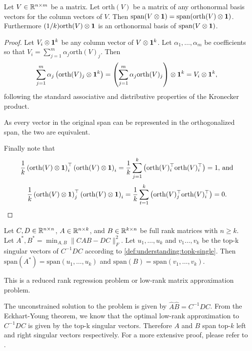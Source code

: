 \begin{lemma}\label{lem:understanding:orth_kronecker}
    Let $V \in \mathbb{R}^{n \times m}$ be a matrix. Let $\mathrm{orth}(V)$ be a matrix of any orthonormal basis vectors for the column vectors of $V$. Then $\mathrm{span}(V\otimes {\bm{1}}) = \mathrm{span}(\mathrm{orth}(V) \otimes {\bm{1}})$. Furthermore $(1/k) \mathrm{orth}(V) \otimes {\bm{1}}$ is an orthonormal basis of $\mathrm{span}(V \otimes {\bm{1}})$.
\end{lemma}

\begin{proof}
    Let $V_i \otimes {\bm{1}}^k$ be any column vector of $V\otimes {\bm{1}}^k$. Let $\alpha_1,\dots,\alpha_m$ be coefficients so that $V_i = \sum_{j=1}^m \alpha_j \mathrm{orth}(V)_j$. Then $$\sum_{j=1}^m \alpha_j \left(\mathrm{orth}(V)_j \otimes {\bm{1}}^k\right) = \left(\sum_{j=1}^m \alpha_j \mathrm{orth}(V)_j\right) \otimes {\bm{1}}^k = V_i \otimes {\bm{1}}^k,$$ following the standard associative and distributive properties of the Kronecker product.

    As every vector in the original span can be represented in the orthogonalized span, the two are equivalent.

    Finally note that $$\frac{1}{k}\left(\mathrm{orth}(V) \otimes {\bm{1}}\right)_i^\top \left(\mathrm{orth}(V) \otimes {\bm{1}}\right)_i = \frac{1}{k}\sum_{j=1}^k \left(\mathrm{orth}(V)_i^\top \mathrm{orth}(V)_i^\top\right) = 1,\,\text{and}$$ $$\frac{1}{k}\left(\mathrm{orth}(V) \otimes {\bm{1}}\right)_j^\top \left(\mathrm{orth}(V) \otimes {\bm{1}}\right)_i = \frac{1}{k}\sum_{t=1}^k \left(\mathrm{orth}(V)_j^\top \mathrm{orth}(V)_i^\top\right) = 0.$$
\end{proof}

\begin{lemma}\label{lem:understanding:rrr}
    Let $C,D \in \mathbb{R}^{n \times n}$, $A\in\mathbb{R}^{n \times k}$, and $B\in\mathbb{R}^{k \times n}$ be full rank matrices with $n \geq k$. Let $A^*, B^* = \min_{A,B} \lVert CAB - DC\rVert^2_F$. Let ${u_1,\dots,u_k}$ and ${v_1\dots,v_k}$ be the top-k singular vectors of $C^{-1}DC$ according to \autoref{def:understanding:topk-single}. Then $\mathrm{span}(A^*) = \mathrm{span}({u_1,\dots,u_k})$ and $\mathrm{span}(B) = \mathrm{span}({v_1,\dots,v_k})$.
\end{lemma}

This is a reduced rank regression problem \parencite{izenman1975reduced} or low-rank matrix approximation problem. 

The unconstrained solution to the problem is given by $\hat{A}\hat{B} = C^{-1}DC$. From the Eckhart-Young theorem, we know that the optimal low-rank approximation to $C^{-1}DC$ is given by the top-k singular vectors.
Therefore $A$ and $B$ span top-$k$ left and right singular vectors respectively.
For a more extensive proof, please refer to \textcite{izenman1975reduced}.

